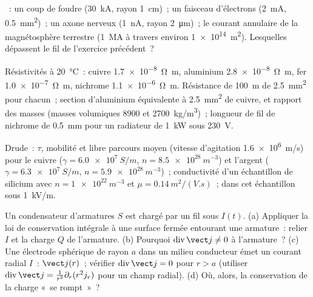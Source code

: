 \begin{exercise}[$\star$]\label{exo:b2:charges-currents-conduction:2}
~: un coup de foudre (\qty{30}{kA}, rayon \qty{1}{cm})~; un
faisceau d'électrons (\qty{2}{mA}, \qty{0.5}{mm^2})~; un axone nerveux (\qty{1}{nA}, rayon
\qty{2}{\micro m})~; le courant annulaire de la magnétosphère terrestre (\qty{1}{MA} à travers
environ \qty{1e14}{m^2}). Lesquelles dépassent le fil de l'exercice précédent~?
\end{exercise}

\begin{exercise}[$\star$]\label{exo:b2:charges-currents-conduction:3}
Résistivités à \qty{20}{\degreeCelsius}~: cuivre \qty{1.7e-8}{\ohm.m}, aluminium
\qty{2.8e-8}{\ohm.m}, fer \qty{1.0e-7}{\ohm.m}, nichrome \qty{1.1e-6}{\ohm.m}.
Résistance de \qty{100}{m} de \qty{2.5}{mm^2} pour chacun~; section d'aluminium
équivalente à \qty{2.5}{mm^2} de cuivre, et rapport des masses (masses volumiques
$8900$ et \qty{2700}{kg/m^3})~; longueur de fil de nichrome de \qty{0.5}{mm} pour un
radiateur de \qty{1}{kW} sous \qty{230}{V}.
\end{exercise}

\begin{exercise}[$\star$]\label{exo:b2:charges-currents-conduction:4}
Drude~: $\tau$, mobilité et libre parcours moyen (vitesse d'agitation \qty{1.6e6}{m/s})
pour le cuivre ($\gamma = \qty{6.0e7}{S/m}$, $n = \qty{8.5e28}{m^{-3}}$) et l'argent
($\gamma = \qty{6.3e7}{S/m}$, $n = \qty{5.9e28}{m^{-3}}$)~; conductivité d'un
échantillon de silicium avec $n = \qty{1e22}{m^{-3}}$ et $\mu = \qty{0.14}{m^2/(V.s)}$~;
 dans cet échantillon sous \qty{1}{kV/m}.
\end{exercise}

\begin{exercise}[$\star\star$]\label{exo:b2:charges-currents-conduction:5}
Un condensateur d'armatures $S$ est chargé par un fil sous $I(t)$. (a) Appliquer
la loi de conservation intégrale à une surface fermée entourant une armature~:
relier $I$ et la charge $Q$ de l'armature. (b) Pourquoi $\operatorname{div}\vect j \ne 0$
à l'armature~? (c) Une électrode sphérique de rayon $a$ dans un milieu
conducteur émet un courant radial $I$~: $\vect j(r)$~; vérifier $\operatorname{div}
\vect j = 0$ pour $r > a$ (utiliser $\operatorname{div}\vect j = \frac1{r^2}\partial_r(r^2j_r)$
pour un champ radial). (d) Où, alors, la conservation de la charge
«~se rompt~»~?
\end{exercise}

